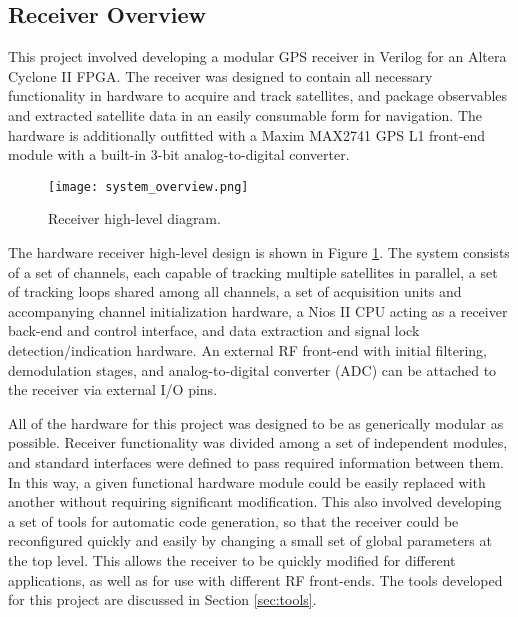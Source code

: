 \documentclass[12pt]{article}
\begin{document}
\subsection{Receiver Overview}
This project involved developing a modular GPS receiver in Verilog for an Altera Cyclone II FPGA. The receiver was designed to contain all necessary functionality in hardware to acquire and track satellites, and package observables and extracted satellite data in an easily consumable form for navigation. The hardware is additionally outfitted with a Maxim MAX2741 GPS L1 front-end module with a built-in 3-bit analog-to-digital converter. \cite{maxim}

\begin{figure}
\centering
\texttt{[image: system\_overview.png]}
\caption{Receiver high-level diagram.}
\label{img:overview}
\end{figure}

The hardware receiver high-level design is shown in Figure \ref{img:overview}. The system consists of a set of channels, each capable of tracking multiple satellites in parallel, a set of tracking loops shared among all channels, a set of acquisition units and accompanying channel initialization hardware, a Nios II CPU acting as a receiver back-end and control interface, and data extraction and signal lock detection/indication hardware. An external RF front-end with initial filtering, demodulation stages, and analog-to-digital converter (ADC) can be attached to the receiver via external I/O pins.

All of the hardware for this project was designed to be as generically modular as possible. Receiver functionality was divided among a set of independent modules, and standard interfaces were defined to pass required information between them. In this way, a given functional hardware module could be easily replaced with another without requiring significant modification. This also involved developing a set of tools for automatic code generation, so that the receiver could be reconfigured quickly and easily by changing a small set of global parameters at the top level. This allows the receiver to be quickly modified for different applications, as well as for use with different RF front-ends. The tools developed for this project are discussed in Section \ref{sec:tools}.
\end{document}
